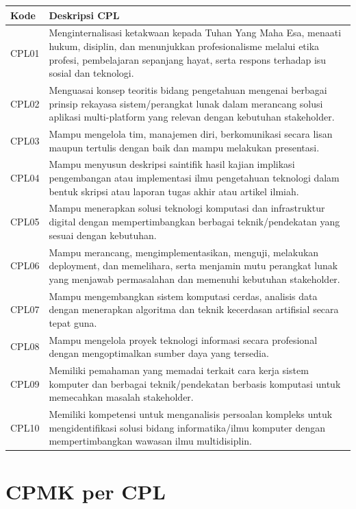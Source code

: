 \begin{longtable}{L{2.2cm}L{11.8cm}}
\toprule
Kode & Deskripsi CPL \\
\midrule
\endhead
CPL01 & Menginternalisasi ketakwaan kepada Tuhan Yang Maha Esa, menaati hukum, disiplin, dan menunjukkan profesionalisme melalui etika profesi, pembelajaran sepanjang hayat, serta respons terhadap isu sosial dan teknologi. \\
CPL02 & Menguasai konsep teoritis bidang pengetahuan mengenai berbagai prinsip rekayasa sistem/perangkat lunak dalam merancang solusi aplikasi multi-platform yang relevan dengan kebutuhan stakeholder. \\
CPL03 & Mampu mengelola tim, manajemen diri, berkomunikasi secara lisan maupun tertulis dengan baik dan mampu melakukan presentasi. \\
CPL04 & Mampu menyusun deskripsi saintifik hasil kajian implikasi pengembangan atau implementasi ilmu pengetahuan teknologi dalam bentuk skripsi atau laporan tugas akhir atau artikel ilmiah. \\
CPL05 & Mampu menerapkan solusi teknologi komputasi dan infrastruktur digital dengan mempertimbangkan berbagai teknik/pendekatan yang sesuai dengan kebutuhan. \\
CPL06 & Mampu merancang, mengimplementasikan, menguji, melakukan deployment, dan memelihara, serta menjamin mutu perangkat lunak yang menjawab permasalahan dan memenuhi kebutuhan stakeholder. \\
CPL07 & Mampu mengembangkan sistem komputasi cerdas, analisis data dengan menerapkan algoritma dan teknik kecerdasan artifisial secara tepat guna. \\
CPL08 & Mampu mengelola proyek teknologi informasi secara profesional dengan mengoptimalkan sumber daya yang tersedia. \\
CPL09 & Memiliki pemahaman yang memadai terkait cara kerja sistem komputer dan berbagai teknik/pendekatan berbasis komputasi untuk memecahkan masalah stakeholder. \\
CPL10 & Memiliki kompetensi untuk menganalisis persoalan kompleks untuk mengidentifikasi solusi bidang informatika/ilmu komputer dengan mempertimbangkan wawasan ilmu multidisiplin. \\
\bottomrule
\end{longtable}

\section{CPMK per CPL}

